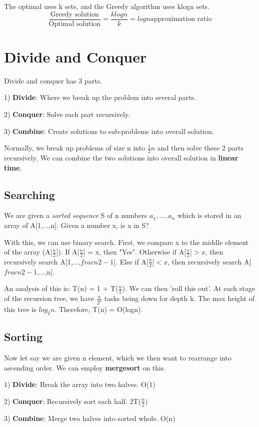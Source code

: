 \documentclass[11pt, oneside]{article}
\theoremstyle{definition}
\begin{document}
The optimal uses k sets, and the Greedy algorithm uses klogn sets.
$$
\frac{\text{Greedy solution}}{\text{Optimal solution}} = \frac{klogn}{k} = logn \text{approximation ratio}
$$
\newpage
\section{Divide and Conquer}
Divide and conquer has 3 parts.

1) \textbf{Divide}: Where we break up the problem into several parts.

2) \textbf{Conquer}: Solve each part recursively.

3) \textbf{Combine}: Create solutions to sub-problems into overall solution.

Normally, we break up problems of size n into $\frac{1}{2}n$ and then solve these 2 parts recursively. We can combine the two solutions into overall solution in \textbf{linear time}.

\subsection{Searching}
We are given a \textit{sorted sequence} S of n numbers $a_1,...,a_n$ which is stored in an array of A[1,...,n]. Given a number x, is x in S?

With this, we can use binary search. First, we compare x to the middle element of the array (A[$\frac{n}{2}$]). If A[$\frac{n}{2}$] = x, then "Yes". Otherwise if A[$\frac{n}{2}] > x$, then recursively search A[1,...,$frac{n}{2-1}$]. Else if A[$\frac{n}{2}] < x$, then recursively search A[$frac{n}{2-1}$,...,n].

An analysis of this is: T(n) = 1 + T($\frac{n}{2}$). We can then 'roll this out'. At each stage of the recursion tree, we have $\frac{n}{2^k}$ tasks being down for depth k. The max height of this tree is $log_2n$. Therefore, T(n) = O(logn).

\subsection{Sorting}
Now let say we are given n element, which we then want to rearrange into ascending order. We can employ \textbf{mergesort} on this.

1) \textbf{Divide}: Break the array into two halves. O(1)

2) \textbf{Conquer}: Recursively sort each half. 2T($\frac{n}{2}$)

3) \textbf{Combine}: Merge two halves into sorted whole. O(n)
\end{document}
